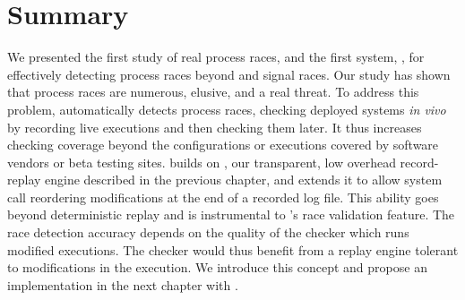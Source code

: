 \section{Summary} \label{racepro:sec:conclusion}

We presented the first study of real process races, and the first
system, \racepro, for effectively detecting process races beyond \toctou
and signal races.   Our study has shown that process races are
numerous, elusive, and a real threat.  To address this problem, \racepro
automatically detects process races, checking deployed
systems \emph{in vivo} by recording live executions and then checking
them later.  It thus increases checking coverage beyond the
configurations or executions covered by software vendors or beta
testing sites. \racepro builds on \scribe, our transparent, low overhead
record-replay engine described in the previous chapter, and extends it
to allow system call reordering modifications at the end of a recorded log file.
This ability goes beyond deterministic replay and is instrumental to
\racepro's race validation feature.
The race detection accuracy depends on the quality of the checker which runs
modified executions. The checker would thus benefit from a replay engine
tolerant to modifications in the execution. We introduce this concept and
propose an implementation in the next chapter with \dora.
